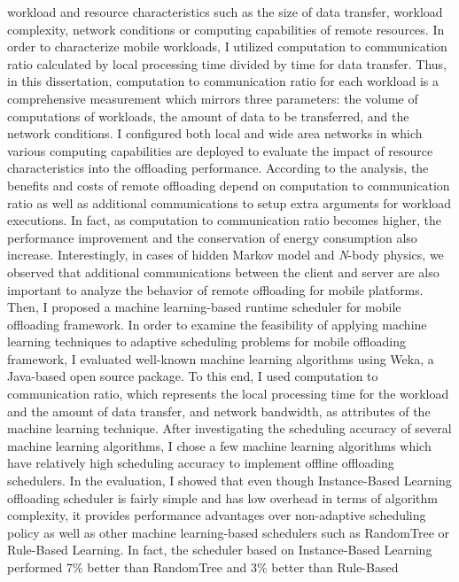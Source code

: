 workload and resource characteristics such as the size of data transfer,
workload complexity, network conditions or computing capabilities of
remote resources. 
%
In order to characterize mobile workloads, I utilized computation to
communication ratio calculated by local processing time divided by
time for data transfer.
%
Thus, in this dissertation, computation to communication ratio for each
workload is a comprehensive measurement which mirrors three parameters:
the volume of computations of workloads, the amount of data to be
transferred, and the network conditions.
%
I configured both local and wide area networks in which 
various computing capabilities are deployed to evaluate the impact of
resource characteristics into the offloading performance.
%
According to the analysis, the benefits and costs of remote
offloading depend on computation to communication ratio as well as
additional communications to setup extra arguments for workload
executions.
%
In fact, as computation to communication ratio becomes higher, 
the performance improvement and the conservation of energy consumption 
also increase.
%
Interestingly, in cases of hidden Markov model and {\it N}-body
physics, we observed that additional communications between the client
and server are also important to analyze the behavior of remote offloading 
for mobile platforms.\\
%
Then, I proposed a machine learning-based runtime scheduler for
mobile offloading framework.
%
In order to examine the feasibility of applying machine learning
techniques to adaptive scheduling problems for mobile offloading
framework, I evaluated well-known machine learning algorithms 
using Weka, a Java-based open source package.
%
To this end, I used computation to communication ratio, which represents
the local processing time for the workload and the amount of data transfer,
and network bandwidth, as attributes of the machine learning
technique.
%
After investigating the scheduling accuracy of several machine learning
algorithms, I chose a few machine learning algorithms which
have relatively high scheduling accuracy to implement offline
offloading schedulers.
%
In the evaluation, I showed that even though Instance-Based Learning 
offloading scheduler is fairly simple and has low overhead in terms of
algorithm complexity, it provides performance advantages over
non-adaptive scheduling policy as well as other machine learning-based
schedulers such as RandomTree or Rule-Based Learning.
%
In fact, the scheduler based on Instance-Based Learning
performed 7\% better than RandomTree and 3\% better than Rule-Based
